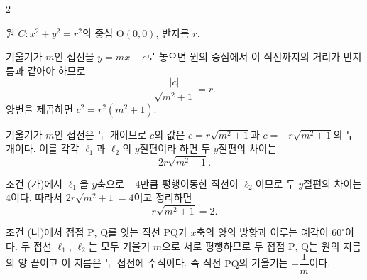 \documentclass[10pt,fleqn]{article}
\begin{document}
\begin{multicols}{2}

\begin{center}
\end{center}

원 $C: x^{2} + y^{2} = r^{2}$의 중심 $\mathrm{O}(0, 0)$, 반지름 $r$.

기울기가 $m$인 접선을 $y = mx + c$로 놓으면 원의 중심에서 이 직선까지의 거리가 반지름과 같아야 하므로
\[ \dfrac{|c|}{\sqrt{m^{2} + 1}} = r. \]
양변을 제곱하면 $c^{2} = r^{2}(m^{2} + 1)$.

기울기가 $m$인 접선은 두 개이므로 $c$의 값은 $c = r\sqrt{m^{2}+1}$과 $c = -r\sqrt{m^{2}+1}$의 두 개이다. 이를 각각 $\ell_{1}$과 $\ell_{2}$의 $y$절편이라 하면 두 $y$절편의 차이는
\[ 2r\sqrt{m^{2} + 1}. \]

조건 (가)에서 $\ell_{1}$을 $y$축으로 $-4$만큼 평행이동한 직선이 $\ell_{2}$이므로 두 $y$절편의 차이는 $4$이다. 따라서 $2r\sqrt{m^{2}+1} = 4$이고 정리하면
\[ r\sqrt{m^{2} + 1} = 2. \tag{1} \]

조건 (나)에서 접점 $\mathrm{P}$, $\mathrm{Q}$를 잇는 직선 $\mathrm{PQ}$가 $x$축의 양의 방향과 이루는 예각이 $60^\circ$이다. 두 접선 $\ell_{1}$, $\ell_{2}$는 모두 기울기 $m$으로 서로 평행하므로 두 접점 $\mathrm{P}$, $\mathrm{Q}$는 원의 지름의 양 끝이고 이 지름은 두 접선에 수직이다. 즉 직선 $\mathrm{PQ}$의 기울기는 $-\dfrac{1}{m}$이다.


\end{multicols}
\end{document}
